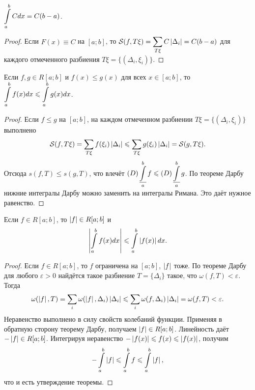 \begin{statement}
    $\displaystyle\int\limits_a^bCdx = C(b - a)$.
\end{statement}

\begin{proof}
    Если $F(x) \equiv C$ на $[a; b]$, то $\displaystyle\mathcal{S}(f, T\xi) = \sum_{T\xi}C\left\lvert\Delta_i\right\rvert = C(b - a)$ для каждого отмеченного разбиения $T\xi = \{(\Delta_i, \xi_i)\}$.
\end{proof}

\begin{theorem}
    Если $f, g \in R[a; b]$ и $f(x) \leqslant g(x)$ для всех $x \in [a; b]$, то $\displaystyle\int\limits_a^bf(x)dx \leqslant \int\limits_a^bg(x)dx$.
\end{theorem}

\begin{proof}
    Если $f \leqslant g$ на $[a; b]$, на каждом отмеченном разбиении $T\xi = \{(\Delta_i, \xi_i)\}$ выполнено
    \[
        \mathcal{S}(f, T\xi) = \sum_{T\xi}f(\xi_i)\left\lvert\Delta_i\right\rvert \leqslant \sum_{T\xi}g(\xi_i)\left\lvert\Delta_i\right\rvert = \mathcal{S}(g, T\xi).
    \]
    Отсюда $s(f, T) \leqslant s(g, T)$, что влечёт $\displaystyle(D)\operatorname*{\underline{\int}}_a^bf \leqslant (D)\operatorname*{\underline{\int}}_a^bg$. По теореме Дарбу нижние интегралы Дарбу можно заменить на интегралы Римана. Это даёт нужное равенство.
\end{proof}

\begin{theorem}
    Если $f \in R[a; b]$, то $\left\lvert f\right\rvert \in R[a; b]$ и
    \[
        \left\lvert\int\limits_a^bf(x)dx\right\rvert \leqslant \int\limits_a^b\left\lvert f(x)\right\rvert dx.
    \]
\end{theorem}

\begin{proof}
    Если $f \in R[a; b]$, то $f$ ограничена на $[a; b]$, $\left\lvert f\right\rvert$ тоже. По теореме Дарбу для любого $\varepsilon > 0$ найдётся такое разбиение $T = \{\Delta_i\}$ такое, что $\omega(f, T) < \varepsilon$. Тогда
    \[
        \omega(\left\lvert f\right\rvert, T) = \sum_i\omega(\left\lvert f\right\rvert, \Delta_i)\left\lvert\Delta_i\right\rvert \leqslant \sum_i\omega(f, \Delta_i)\left\lvert\Delta_i\right\rvert = \omega(f, T) < \varepsilon.
    \]
    Неравенство выполнено в силу свойств колебаний функции. Применяя в обратную сторону теорему Дарбу, получаем $\left\lvert f\right\rvert \in R[a; b]$. Линейность даёт $-\left\lvert f\right\rvert \in R[a; b]$. Интегрируя неравенство $-\left\lvert f(x)\right\rvert \leqslant f(x) \leqslant \left\lvert f(x)\right\rvert$, получим
    \[
        -\int\limits_a^b\left\lvert f\right\rvert \leqslant \int\limits_a^bf \leqslant \int\limits_a^b\left\lvert f\right\rvert,
    \]
    что и есть утверждение теоремы.
\end{proof}

